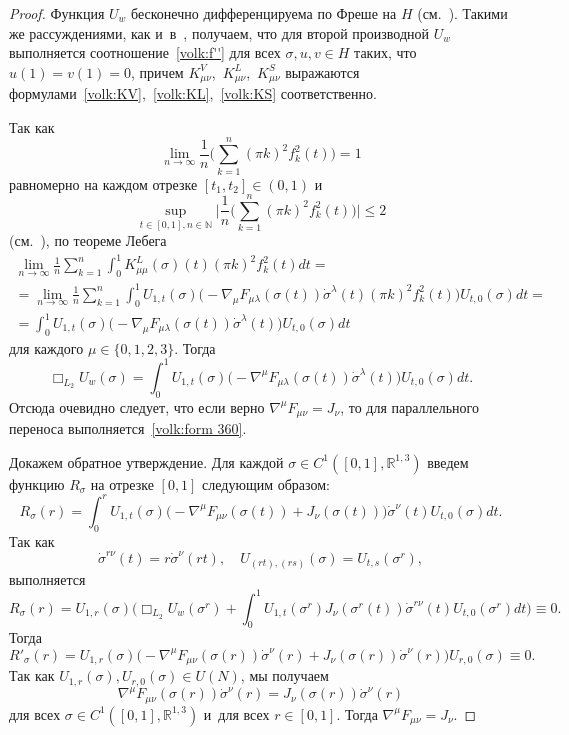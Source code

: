 \begin{proof}
Функция $U_{w}$ %
бесконечно дифференцируема по Фреше на $H$ (см.~\cite{volkov:bib:Gross}).
Такими же  рассуждениями, как и~в~\cite{volkov:bib:AGV},  получаем, что
для второй производной $U_{w}$ выполняется соотношение~\eqref{volk:f''} для всех $\sigma,u,v\in H$ таких, что $u(1)=v(1)=0$, причем $K_{\mu\nu}^V$,~$K_{\mu\nu}^L$,~$K_{\mu\nu}^S$ выражаются формулами~\eqref{volk:KV},~\eqref{volk:KL},~\eqref{volk:KS} соответственно.



Так как $$\lim_{n\to\infty}\frac 1n \biggl(\sum_{k=1}^n(\pi k)^2f^2_k(t)\biggr)=1$$ 
равномерно на каждом отрезке $[t_1,t_2]\in(0, 1)$ и 
$$\sup_{t\in[0, 1], n\in\mathbb{N}} \biggl|\frac 1n \biggl(\sum_{k=1}^n(\pi k)^2f^2_k(t) \biggr)\biggr|\leq2$$ (см.~\cite{volkov:bib:L}), по теореме Лебега %
\begin{multline} 
\lim_{n\to\infty}\frac 1n\sum_{k=1}^n\int_0^1K^{L}_{\mu\mu}(\sigma)(t)(\pi k)^2f^2_k(t)dt=\\
=\lim_{n\to\infty}\frac 1n\sum_{k=1}^n\int_0^1U_{1,t}(\sigma)
\bigl( -\nabla_\mu F_{\mu\lambda}(\sigma(t))\dot{\sigma}^\lambda(t)(\pi k)^2f^2_k(t)\bigr)U_{t, 0}(\sigma)dt=\\=\int_0^1U_{1,t}(\sigma)\bigl(-\nabla_\mu F_{\mu\lambda}(\sigma(t))\dot{\sigma}^\lambda(t)\bigr)U_{t, 0}(\sigma)dt
\end{multline}
для каждого $\mu\in\{0, 1, 2, 3\}$. 
Тогда 
$$\Box_{L_{2}}U_w(\sigma)=\int_0^1U_{1,t}(\sigma)\bigl(-\nabla^\mu F_{\mu\lambda}(\sigma(t))\dot{\sigma}^\lambda(t)\bigr)U_{t, 0}(\sigma)dt.$$
Отсюда  очевидно следует, что если верно $\nabla^\mu F_{\mu\nu}=J_\nu$, то для параллельного переноса выполняется~\eqref{volk:form 360}.

\smallskip
 Докажем обратное утверждение.
Для каждой $\sigma\in C^1([0, 1],\mathbb{R}^{1,3})$ введем  функцию  $R_\sigma$  на отрезке $[0, 1]$
следующим образом:
$$R_\sigma(r)=\int_0^r U_{1,t}(\sigma)\bigl(-\nabla^\mu F_{\mu\nu}(\sigma(t))+J_\nu(\sigma(t))\bigr)\dot{\sigma}^\nu(t)U_{t, 0}(\sigma)dt.$$
Так как 
$${\dot{\sigma}^{r\nu}(t)}=r{\dot{\sigma}^{\nu}(rt)},\quad U_{(rt),(rs)}(\sigma)=U_{t,s}(\sigma^r),$$ 
выполняется
$$R_\sigma(r)=U_{1,r}(\sigma)\biggl(\Box_{L_2} U_{w}(\sigma^r)+\int_0^1U_{1,t}({\sigma^r})J_\nu(\sigma^r(t)){\dot{\sigma}^{r\nu}(t)} U_{t, 0}({\sigma^r}) dt  \biggr)  \equiv0.$$
Тогда
$$R'_\sigma(r)= U_{1,r}(\sigma)
\bigl(-\nabla^\mu F_{\mu\nu}(\sigma(r))\dot{\sigma}^\nu(r)+J_\nu(\sigma(r))\dot{\sigma}^\nu(r) \bigr)U_{r, 0}(\sigma)\equiv0.$$
 Так как $U_{1,r}(\sigma),U_{r, 0}(\sigma)\in U(N)$,  мы получаем 
 $$\nabla^\mu F_{\mu\nu}(\sigma(r))\dot{\sigma}^\nu(r)=J_\nu(\sigma(r))\dot{\sigma}^\nu(r)$$ для всех $\sigma\in C^1([0, 1],\mathbb{R}^{1, 3})$ и~для всех $r\in[0, 1]$. Тогда $\nabla^\mu F_{\mu\nu}=J_\nu$.
\end{proof}


